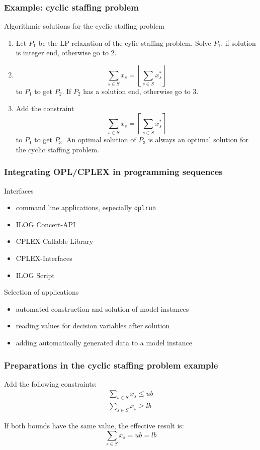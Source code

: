 \begin{frame}
 \frametitle{Example: cyclic staffing problem}
 \begin{block}{Algorithmic solutions for the cyclic staffing problem}\footnotesize
  \begin{enumerate}
   \item Let $P_1$ be the LP relaxation of the cylic staffing problem. Solve $P_1$, if solution is integer end, otherwise go to 2.
   \item  \[\sum_{s\in S}x_s = \left\lfloor\sum_{s\in S}x^*_s\right\rfloor\] to $P_1$ to get $P_2$. If $P_2$ has a solution end, otherwise go to 3.
   \item Add the constraint\[\sum_{s\in S}x_s = \left\lceil\sum_{s\in S}x^*_s\right\rceil\] to $P_1$ to get $P_3$. An optimal solution of $P_3$ is always an optimal solution for the cyclic staffing problem.
  \end{enumerate}
 \end{block}
\end{frame}

\begin{frame}
 \frametitle{Integrating OPL/CPLEX in programming sequences}
 \footnotesize
 \begin{block}{Interfaces}
  \begin{itemize}
    \item command line applications, especially \texttt{oplrun}
    \item ILOG Concert-API
    \item CPLEX Callable Library
    \item CPLEX-Interfaces
    \item ILOG Script
  \end{itemize}
 \end{block}
 \pause
 \begin{block}{Selection of applications}
  \begin{itemize}
   \item automated construction and solution of model instances
   \item reading values for decision variables after solution
   \item adding automatically generated data to a model instance
  \end{itemize}
 \end{block}
\end{frame}

\begin{frame}
 \frametitle{Preparations in the cyclic staffing problem example}
 Add the following constraints:
 \begin{gather*}
  \sum_{s\in S}x_s \leq ub\label{eq:CyclicStaffingUB}\\
  \sum_{s\in S}x_s \geq lb\label{eq:CyclicStaffingLB}
 \end{gather*}
 
 If both bounds have the same value, the effective result is:
 \[
  \sum_{s\in S}x_s = ub = lb
 \]
\end{frame}

